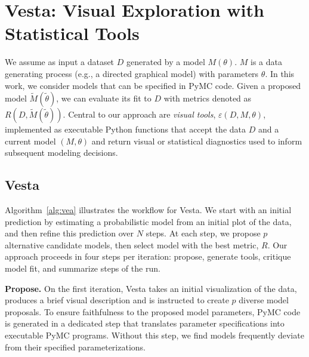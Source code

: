 \documentclass{article}
\newcommand\gd[1]{\todo[color=red!40]{{\bf Greg}: #1}}
\newcommand\jl[1]{\todo[color=blue!40]{{\bf Jessy}: #1}}
\newcommand{\method}{{\sc Vesta}}
\begin{document}
\section{\method{}: Visual Exploration  with Statistical Tools}

We assume as input a dataset $D$ generated by a model $M(\theta)$. $M$ is a data generating process (e.g., a directed graphical model) with parameters $\theta$. In this work, we consider models that can be specified in PyMC code. Given a proposed model $\tilde{M}(\tilde{\theta})$, we can evaluate its fit to $D$ with metrics denoted as $R(D,\tilde{M}(\tilde{\theta}))$. Central to our approach are \textit{visual tools}, $\varepsilon(D, M, \theta)$, implemented as executable Python functions that accept the data $D$ and a current model $(M, \theta)$ and return visual or statistical diagnostics used to inform subsequent modeling decisions.

\subsection{\method{}}
\vspace{-0.3em}
Algorithm~\ref{alg:vea} illustrates the workflow for \method{}. We start with an initial prediction by estimating a probabilistic model from an initial plot of the data, and then refine this prediction over $N$ steps. At each step, we propose $p$ alternative candidate models, then select model with the best metric, $R$. Our approach proceeds in four steps per iteration: propose, 
generate tools, critique model fit, and summarize steps of the run.

\textbf{Propose.} On the first iteration, \method{} takes an initial 
visualization of the data, produces a brief visual description  and is instructed to create $p$ diverse model proposals. To ensure faithfulness
to the proposed model parameters, PyMC code is generated in a dedicated step that 
translates parameter specifications into executable PyMC programs. Without this step, we find models frequently deviate from their specified 
parameterizations.
\end{document}
